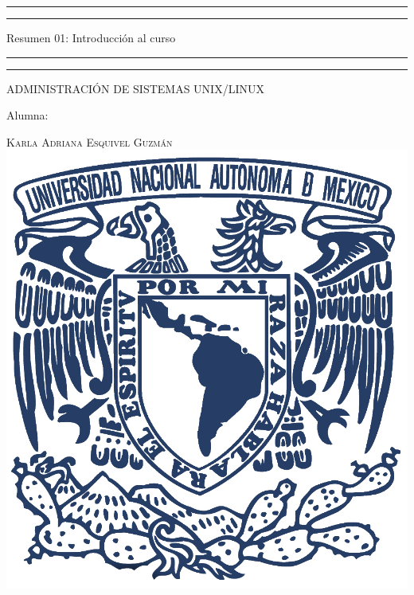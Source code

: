 \documentclass[a4paper, 11pt, oneside]{article}
\begin{document}
 

\begin{titlepage} 

	\centering 
	
	\scshape 
	
	\vspace*{\baselineskip} 
	
	
	
	\rule{\textwidth}{1.6pt}\vspace*{-\baselineskip}\vspace*{2pt} 
	\rule{\textwidth}{0.4pt} 
	
	\vspace{0.75\baselineskip} 
	
	{\LARGE Resumen 01: Introducción al curso}	
	\vspace{0.75\baselineskip} 
	
	\rule{\textwidth}{0.4pt}\vspace*{-\baselineskip}\vspace{3.2pt}
	\rule{\textwidth}{1.6pt} 
	
	\vspace{2\baselineskip} 
	

	ADMINISTRACIÓN DE SISTEMAS UNIX/LINUX
	
	\vspace*{3\baselineskip} 
	
	
	
	Alumna:
	
	\vspace{0.5\baselineskip} 
	
	{\scshape\Large Karla Adriana Esquivel Guzmán \\} 
	\vspace{0.5\baselineskip} 
	\vfill
	\includegraphics{unam.jpg}
	

\end{titlepage}
\end{document}
